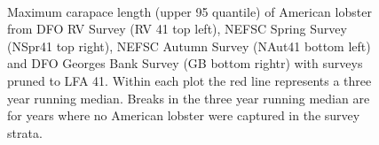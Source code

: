 \documentclass[11pt]{article}
\newcommand{\D}{.}
\newcommand{\e}{/backup/bio_data/bio.lobster/figures/} %
\begin{document}
\begin{figure}
\centering
{}
\\

\caption{Maximum carapace length (upper 95 quantile) of American lobster from DFO RV Survey (RV 41 top left), NEFSC Spring Survey (NSpr41 top right), NEFSC Autumn Survey (NAut41 bottom left) and DFO Georges Bank Survey (GB bottom rightr) with surveys pruned to LFA 41. Within each plot the red line represents a three year running median. Breaks in the three year running median are for years where no American lobster were captured in the survey strata. }
\end{figure}
\clearpage

\end{document}
